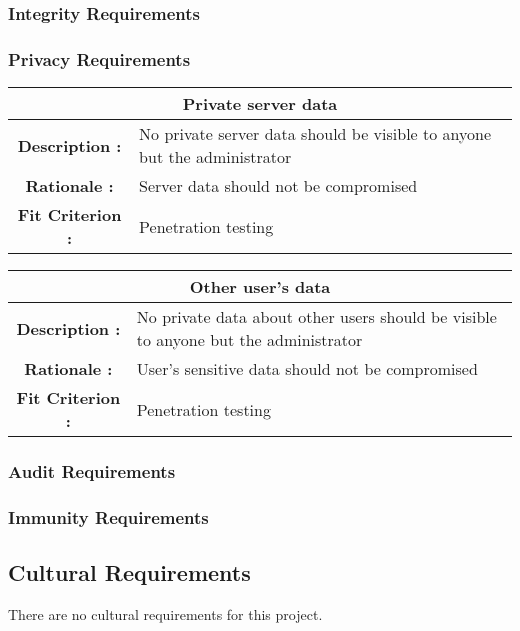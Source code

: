 \documentclass[12pt, titlepage]{article}
\begin{document}
\subsubsection{Integrity Requirements}
\subsubsection{Privacy Requirements}

\begin{center}
\begin{table}[H]
\begin{tabularx}{\textwidth}{| c X |}
\hline
\multicolumn{2}{|c|}{\textbf{Private server data}}\\
\hline
\textbf{Description : } & No private server data should be visible to anyone
but the administrator\\
\hline
\textbf{Rationale : } & Server data should not be compromised\\
\hline
\textbf{Fit Criterion : } & Penetration testing\\
\hline
\end{tabularx}
\end{table}
\end{center}

\begin{center}
\begin{table}[H]
\begin{tabularx}{\textwidth}{| c X |}
\hline
\multicolumn{2}{|c|}{\textbf{Other user's data}}\\
\hline
\textbf{Description : } & No private data about other users should be visible
to anyone but the administrator\\
\hline
\textbf{Rationale : } & User's sensitive data should not be compromised\\
\hline
\textbf{Fit Criterion : } & Penetration testing\\
\hline
\end{tabularx}
\end{table}
\end{center}

\subsubsection{Audit Requirements}
\subsubsection{Immunity Requirements}

\subsection{Cultural Requirements}
There are no cultural requirements for this project.
\end{document}
